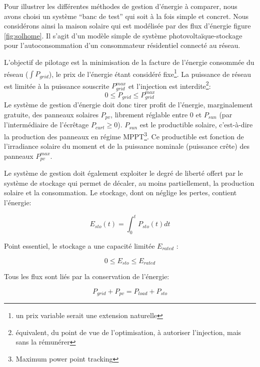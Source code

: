 \documentclass[a4paper,10pt,twocolumn]{article}
\begin{document}
Pour illustrer les différentes méthodes de gestion d'énergie à comparer,
nous avons choisi un système ``banc de test'' qui soit à la fois simple et concret.
Nous considérons ainsi la maison solaire qui est modélisée par
des flux d'énergie figure \ref{fig:solhome}.
Il s'agit d'un modèle simple de système photovoltaïque-stockage
pour l'autoconsommation d'un consommateur résidentiel connecté au réseau.

L'objectif de pilotage est la minimisation de la facture
de l'énergie consommée du réseau ($\int P_{grid}$), le prix de l'énergie étant considéré fixe\footnote{un prix variable serait une extension naturelle}.
La puissance de réseau est limitée à la puissance souscrite $P_{grid}^{max}$
et l'injection est interdite\footnote{
équivalent, du point de vue de l'optimisation, à autoriser l'injection, mais sans la rémunérer}:
%
\begin{equation}
  0 \leq P_{grid} \leq P_{grid}^{max}
\end{equation}
%
Le système de gestion d'énergie doit donc tirer profit de l'énergie, marginalement
gratuite, des panneaux solaires $P_{pv}$, librement réglable entre 0 et $P_{sun}$
(par l'intermédiaire de l'écrêtage $P_{curt} \geq 0$).
$P_{sun}$ est le productible solaire, c'est-à-dire la production des panneaux en régime
MPPT\footnote{Maximum power point tracking}.
Ce productible est fonction de l'irradiance solaire du moment
et de la puissance nominale (puissance crête) des panneaux $P_{pv}^{max}$.

Le système de gestion doit également exploiter le degré de liberté offert par
le système de stockage qui permet de décaler, au moins partiellement,
la production solaire et la consommation. Le stockage, dont on néglige les pertes,
contient l'énergie:

\begin{equation}
  E_{sto}(t) = \int_0^t P_{sto}(t)dt
\end{equation}

Point essentiel, le stockage a une capacité limitée $E_{rated}$ :

\begin{equation}
  0 \leq E_{sto} \leq E_{rated}
\end{equation}

Tous les flux sont liés par la conservation de l'énergie:

\begin{equation}
  P_{grid} + P_{pv} = P_{load} + P_{sto}
\end{equation}
\end{document}
